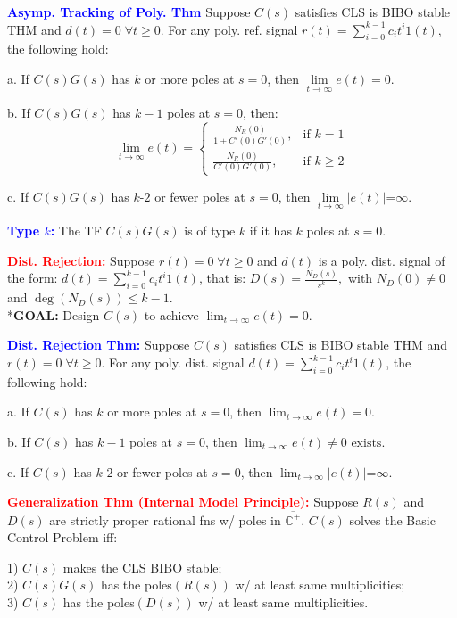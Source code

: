 \documentclass[5pt]{extarticle} %
\begin{document}
\begin{paracol}{3}
{    \textcolor{blue}{\textbf{Asymp. Tracking of Poly. Thm}} Suppose $C(s)$ satisfies CLS is BIBO stable THM and $d(t) = 0 \; \forall t \geq 0$. For any poly. ref. signal $r(t) = \sum_{i=0}^{k-1} c_i t^i 1(t)$, the following hold:

    a. If $C(s) G(s)$ has $k$ or more poles at $s = 0$, then $\lim\limits_{t \to \infty} e(t) = 0$.

    b. If $C(s) G(s)$ has $k-1$ poles at $s = 0$, then:
    \[ \lim\limits_{t \to \infty} e(t) = \begin{cases} \frac{N_R(0)}{1 + C'(0) G'(0)}, & \text{if } k = 1 \\ \frac{N_R(0)}{C'(0) G'(0)}, & \text{if } k \geq 2 \end{cases} \]

    c. If $C(s) G(s)$ has $k\text{-}2$ or fewer poles at $s = 0$, then $\lim\limits_{t \to \infty} |e(t)| \text{=} \infty$.

    \textcolor{blue}{\textbf{Type $k$:}} The TF $C(s) G(s)$ is of type $k$ if it has $k$ poles at $s = 0$.

    \textcolor{red}{\textbf{Dist. Rejection:}} Suppose $r(t) = 0 \; \forall t \geq 0$ and $d(t)$ is a poly. dist. signal of the form:
    $d(t) = \sum_{i=0}^{k-1} c_i t^i 1(t)$,
    that is:
    $D(s) = \frac{N_D(s)}{s^k},$ with $N_D(0) \neq 0$ and $\deg(N_D(s)) \leq k-1.$ \\
    *\textbf{GOAL:} Design $C(s)$ to achieve $\lim_{t \to \infty} e(t) = 0.$

    \textcolor{blue}{\textbf{Dist. Rejection Thm:}} Suppose $C(s)$ satisfies CLS is BIBO stable THM and $r(t) = 0 \; \forall t \geq 0$. For any poly. dist. signal $d(t) = \sum_{i=0}^{k-1} c_i t^i 1(t)$, the following hold:

        a. If $C(s)$ has $k$ or more poles at $s = 0$, then $\lim_{t \to \infty} e(t) = 0.$

        b. If $C(s)$ has $k-1$ poles at $s = 0$, then $\lim_{t \to \infty} e(t) \neq 0 \text{ exists}.$ 

        c. If $C(s)$ has $k\text{-}2$ or fewer poles at $s = 0$, then $\lim_{t \to \infty} |e(t)| \text{=} \infty.$

    \textcolor{red}{\textbf{Generalization Thm (Internal Model Principle):}} Suppose $R(s)$ and $D(s)$ are strictly proper rational fns w/ poles in $\overline{\mathbb{C}^{+}}$. $C(s)$ solves the Basic Control Problem iff:

    1) $C(s)$ makes the CLS BIBO stable; \\
    2) $C(s) G(s)$ has the poles$(R(s))$ w/ at least same multiplicities; \\
    3) $C(s)$ has the poles$(D(s))$ w/ at least same multiplicities.

}
\end{paracol}
\end{document}
